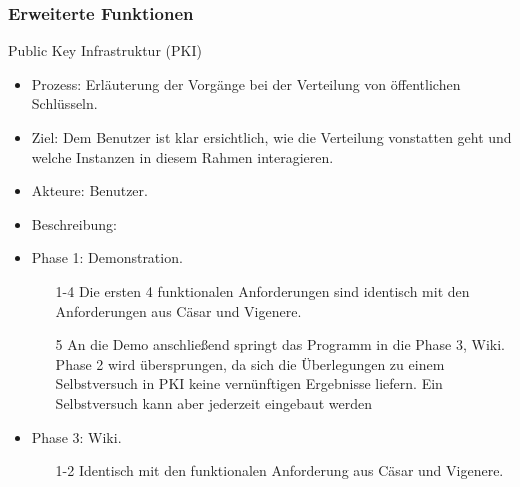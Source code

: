 \documentclass{article}
\begin{document}
\subsubsection{Erweiterte Funktionen}

\begin{FA}[start=500]
\item Public Key Infrastruktur (PKI)
\end{FA}
\begin{itemize}[label={}]
\item Prozess: Erläuterung der Vorgänge bei der Verteilung von öffentlichen Schlüsseln.
\item Ziel: Dem Benutzer ist klar ersichtlich, wie die Verteilung vonstatten geht und welche Instanzen in diesem Rahmen 
            interagieren.
\item Akteure: Benutzer.
\item Beschreibung:
\item Phase 1: Demonstration.
\begin{enumerate}
 \item[1-4] Die ersten 4 funktionalen Anforderungen sind identisch mit den Anforderungen aus Cäsar und Vigenere. 
 \item[5] An die Demo anschließend springt das Programm in die Phase 3, Wiki. Phase 2 wird übersprungen, 
da sich die Überlegungen zu einem Selbstversuch in PKI keine vernünftigen Ergebnisse liefern. Ein 
Selbstversuch kann aber jederzeit eingebaut werden
\end{enumerate}
\item Phase 3: Wiki.
\begin{enumerate}
 \item[1-2] Identisch mit den funktionalen Anforderung aus Cäsar und Vigenere.
\end{enumerate}
\end{itemize}
\end{document}
